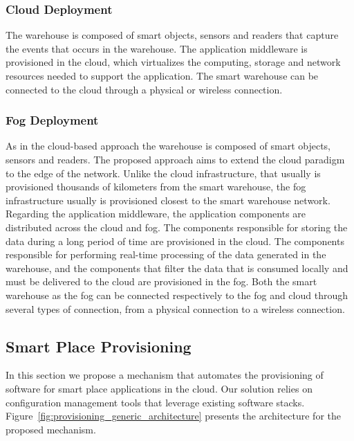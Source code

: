 \subsubsection{Cloud Deployment}
\label{subs:sol_cloud}
The warehouse is composed of smart objects, sensors and readers that capture the events that occurs
in the warehouse. The application middleware is provisioned in the cloud, which virtualizes the computing,
storage and network resources needed to support the application. The smart warehouse can be connected
to the cloud through a physical or wireless connection.\\

\subsubsection{Fog Deployment}
\label{subs:sol_fog}
As in the cloud-based approach the warehouse is composed of smart objects, sensors and readers.
The proposed approach aims to extend the cloud paradigm to the edge of the network. Unlike the
cloud infrastructure, that usually is provisioned thousands of kilometers from the smart warehouse,
the fog infrastructure usually is provisioned closest to the smart warehouse network.\\

Regarding the application middleware, the application components are distributed across the cloud and
fog. The components responsible for storing the data during a long period of time are provisioned in
the cloud. The components responsible for performing real-time processing of the data generated in the
warehouse, and the components that filter the data that is consumed locally and must be delivered to
the cloud are provisioned in the fog. Both the smart warehouse as the fog can be connected respectively
to the fog and cloud through several types of connection, from a physical connection to a wireless
connection.

\subsection{Smart Place Provisioning}
\label{subs:sol_provisioning}
In this section we propose a mechanism that automates the provisioning of software for smart place
applications in the cloud. Our solution relies on configuration management tools that leverage
existing software stacks. Figure~\ref{fig:provisioning_generic_architecture} presents the architecture
for the proposed mechanism.\\

